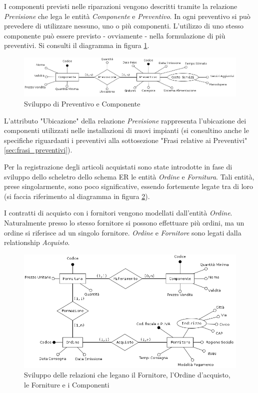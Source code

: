 			I componenti previsti nelle riparazioni vengono descritti tramite la relazione \emph{Previsione} che lega le entità \emph{Componente} e \emph{Preventivo}. In ogni preventivo si può prevedere di utilizzare nessuno, uno o più componenti. L'utilizzo di uno stesso componente può essere previsto - ovviamente - nella formulazione di più preventivi.
			Si consulti il diagramma in figura \ref{fig:preventivo_componente}.
			
			\begin{figure}[H]
				\centering
				\includegraphics[width=13cm]{images/finitures/preventivo_componente.png}
				\caption{Sviluppo di Preventivo e Componente}
				\label{fig:preventivo_componente}
			\end{figure}
			
			L'attributo "Ubicazione" della relazione \emph{Previsione} rappresenta l'ubicazione dei componenti utilizzati nelle installazioni di nuovi impianti (si consultino anche le specifiche riguardanti i preventivi alla sottosezione "Frasi relative ai Preventivi" \ref{sec:frasi_preventivi}).
			
			Per la registrazione degli articoli acquistati sono state introdotte in fase di sviluppo dello scheletro dello schema ER le entità \emph{Ordine} e \emph{Fornitura}. Tali entità, prese singolarmente, sono poco significative, essendo fortemente legate tra di loro (si faccia riferimento al diagramma in figura \ref{fig:fornitore_ordine_fornitura_componente}).
			
			I contratti di acquisto con i fornitori vengono modellati dall'entità \emph{Ordine}. Naturalmente presso lo stesso fornitore si possono effettuare più ordini, ma un ordine si riferisce ad un singolo fornitore. \emph{Ordine} e \emph{Fornitore} sono legati dalla relationship \emph{Acquisto}.
			
			\begin{figure}[H]
				\centering
				\includegraphics[width=13cm]{images/finitures/fornitore_ordine_fornitura_componente}
				\caption{Sviluppo delle relazioni che legano il Fornitore, l'Ordine d'acquisto, le Forniture e i Componenti}
				\label{fig:fornitore_ordine_fornitura_componente}
			\end{figure}
			
